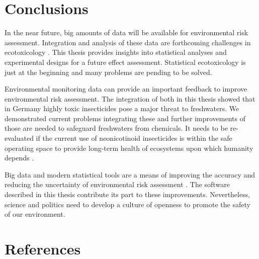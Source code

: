 \clearpage
\section{Conclusions}
In the near future, big amounts of data will be available for environmental risk assessment. 
Integration and analysis of these data are forthcoming challenges in  ecotoxicology \citep{dafforn_big_2015, van_den_brink_new_2016}. 
This thesis provides insights into statistical analyses and experimental designs for a future effect assessment. Statistical ecotoxicology is just at the beginning and many problems are pending to be solved.

Environmental monitoring data can provide an important feedback to improve environmental risk assessment. 
The integration of both in this thesis showed that in Germany highly toxic insecticides pose a major threat to freshwaters.
We demonstrated current problems integrating these and further improvements of those are needed to safeguard freshwaters from chemicals.
It needs to be re-evaluated if the current use of neonicotinoid insecticides is within the safe operating space to provide long-term health of ecosystems upon which humanity depends \citep{rockstrom_safe_2009}.

Big data and modern statistical tools are a means of improving the accuracy and reducing the uncertainty of environmental risk assessment \citep{van_den_brink_new_2016}. 
The software described in this thesis contribute its part to these improvements.
Nevertheless, science and politics need to develop a culture of openness to promote the safety of our environment.



\clearpage
\section{References}
\printbibliography[heading=none]
